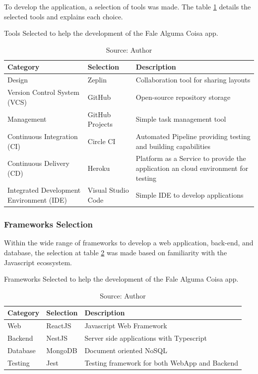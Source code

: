 To develop the application, a selection of tools was made. The table \ref{tab:tools-selection} details the selected tools and explains each choice.

\begin{table}[h]
    \centering
    \caption{Tools Selected to help the development of the Fale Alguma Coisa app.}
    \label{tab:tools-selection}
    \begin{tabular}{|p{5cm}|p{2.5cm}|p{7cm}|}
        \hline Category & Selection & Description \\
        \hline Design & Zeplin & Collaboration tool for sharing layouts \\ 
        \hline Version Control System (VCS) & GitHub & Open-source repository storage \\
        \hline Management & GitHub Projects & Simple task management tool \\
        \hline Continuous Integration (CI) & Circle CI & Automated Pipeline providing testing and building capabilities \\ 
        \hline Continuous Delivery (CD) & Heroku & Platform as a Service to provide the application an cloud environment for testing \\ 
        \hline Integrated Development Environment (IDE) & Visual Studio Code & Simple IDE to develop applications \\ \hline 
    \end{tabular}
    \caption*{Source: Author}
\end{table}

\subsubsection{Frameworks Selection}

Within the wide range of frameworks to develop a web application, back-end, and database, the selection at table \ref{tab:frameworks-selection} was made based on familiarity with the Javascript ecossystem.

\begin{table}[h]
    \centering
    \caption{Frameworks Selected to help the development of the Fale Alguma Coisa app.}
    \label{tab:frameworks-selection}
    \begin{tabular}{|p{5cm}|p{2.5cm}|p{7cm}|}
        \hline Category & Selection & Description \\
        \hline Web & ReactJS & Javascript Web Framework \\ 
        \hline Backend & NestJS & Server side applications with Typescript \\ 
        \hline Database & MongoDB & Document oriented NoSQL \\ 
        \hline Testing & Jest & Testing framework for both WebApp and Backend \\ \hline 
    \end{tabular}
    \caption*{Source: Author}
\end{table}

